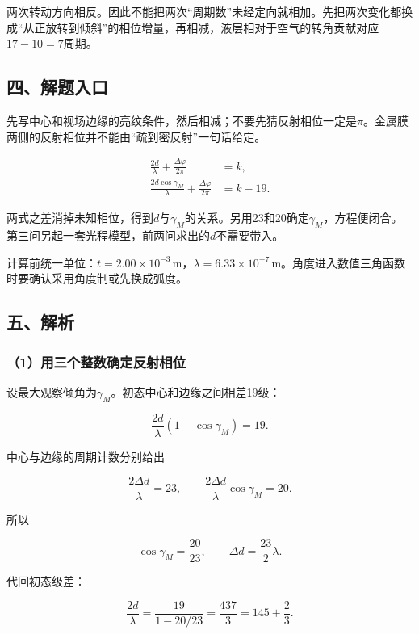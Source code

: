 \documentclass[12pt,a4paper,fontset=fandol]{ctexart}
\begin{document}
两次转动方向相反。因此不能把两次``周期数''未经定向就相加。先把两次变化都换成``从正放转到倾斜''的相位增量，再相减，液层相对于空气的转角贡献对应\(17-10=7\)周期。

\subsection{四、解题入口}\label{ux56dbux89e3ux9898ux5165ux53e3}

先写中心和视场边缘的亮纹条件，然后相减；不要先猜反射相位一定是\(\pi\)。金属膜两侧的反射相位并不能由``疏到密反射''一句话给定。

\[
\begin{aligned}
\frac{2d}{\lambda}+\frac{\Delta\varphi}{2\pi}&=k,\\
\frac{2d\cos\gamma_M}{\lambda}
+\frac{\Delta\varphi}{2\pi}&=k-19.
\end{aligned}
\]

两式之差消掉未知相位，得到\(d\)与\(\gamma_M\)的关系。另用23和20确定\(\gamma_M\)，方程便闭合。第三问另起一套光程模型，前两问求出的\(d\)不需要带入。

计算前统一单位：\(t=2.00\times10^{-3}\,\mathrm m\)，\(\lambda=6.33\times10^{-7}\,\mathrm m\)。角度进入数值三角函数时要确认采用角度制或先换成弧度。

\subsection{五、解析}\label{ux4e94ux89e3ux6790}

\subsubsection{（1）用三个整数确定反射相位}\label{ux7528ux4e09ux4e2aux6574ux6570ux786eux5b9aux53cdux5c04ux76f8ux4f4d}

设最大观察倾角为\(\gamma_M\)。初态中心和边缘之间相差19级：

\[
\frac{2d}{\lambda}(1-\cos\gamma_M)=19.
\]

中心与边缘的周期计数分别给出

\[
\frac{2\Delta d}{\lambda}=23,
\qquad
\frac{2\Delta d}{\lambda}\cos\gamma_M=20.
\]

所以

\[
\cos\gamma_M=\frac{20}{23},
\qquad \Delta d=\frac{23}{2}\lambda.
\]

代回初态级差：

\[
\frac{2d}{\lambda}
=\frac{19}{1-20/23}
=\frac{437}{3}=145+\frac23.
\]
\end{document}
